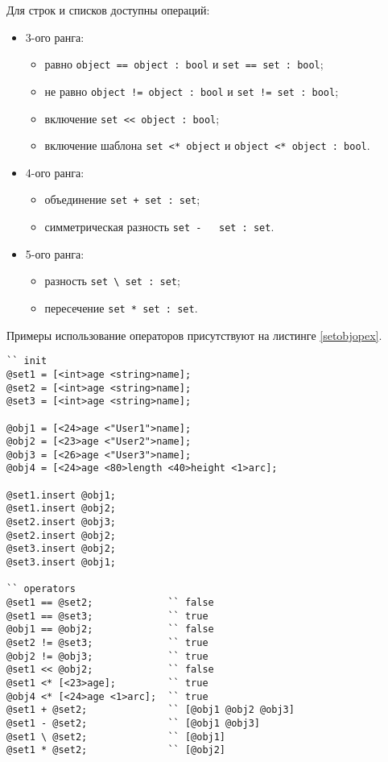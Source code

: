 \documentclass[a4paper, 14pt]{extarticle}
\newenvironment{icItems}
	{ \begin{itemize} [noitemsep,nolistsep] }
	{ \end{itemize} }
\begin{document}
	Для строк и списков доступны операций:
\begin{icItems}
	\item 3-ого ранга:
		\begin{icItems}
		\item равно \lstinline`object == object : bool` и \lstinline`set == set : bool`;
		\item не равно \lstinline`object != object : bool` и \lstinline`set != set : bool`;
		\item включение \lstinline`set << object : bool`;
		\item включение шаблона \lstinline`set <* object` и \lstinline`object <* object : bool`.
		\end{icItems}
	\item 4-ого ранга:
		\begin{icItems}
		\item объединение \lstinline`set + set : set`;
		\item симметрическая разность \lstinline`set -   set : set`.
		\end{icItems}
	\item 5-ого ранга:
		\begin{icItems}
		\item разность \lstinline`set \ set : set`;
		\item пересечение \lstinline`set * set : set`.
		\end{icItems}
\end{icItems}

	Примеры использование операторов присутствуют на листинге \ref{setobjopex}.

\begin{lstlisting}[caption=Примеры использования операторов над данными типа object и set, label=setobjopex]
`` init
@set1 = [<int>age <string>name];
@set2 = [<int>age <string>name];
@set3 = [<int>age <string>name];

@obj1 = [<24>age <"User1">name];
@obj2 = [<23>age <"User2">name];
@obj3 = [<26>age <"User3">name];
@obj4 = [<24>age <80>length <40>height <1>arc];

@set1.insert @obj1;
@set1.insert @obj2;
@set2.insert @obj3;
@set2.insert @obj2;
@set3.insert @obj2;
@set3.insert @obj1;

`` operators
@set1 == @set2;				`` false
@set1 == @set3;				`` true
@obj1 == @obj2;				`` false
@set2 != @set3;				`` true
@obj2 != @obj3;				`` true
@set1 << @obj2;				`` false
@set1 <* [<23>age];			`` true
@obj4 <* [<24>age <1>arc];	`` true
@set1 + @set2;				`` [@obj1 @obj2 @obj3]
@set1 - @set2;				`` [@obj1 @obj3]
@set1 \ @set2;				`` [@obj1]
@set1 * @set2;				`` [@obj2]
\end{lstlisting}
\end{document}
